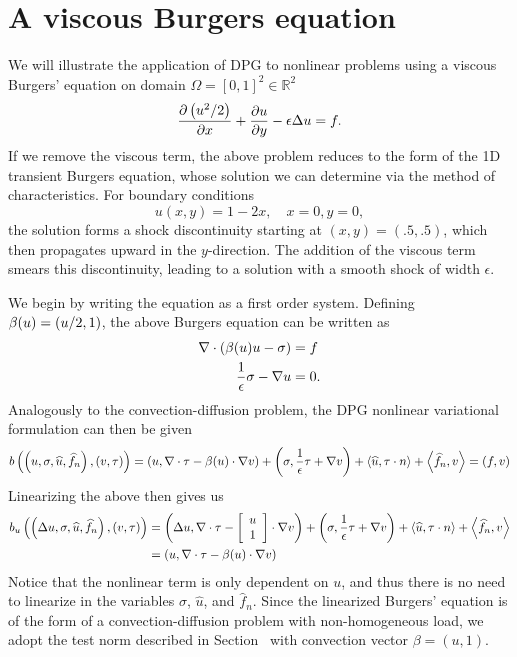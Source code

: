 \section{A viscous Burgers equation}

We will illustrate the application of DPG to nonlinear problems using a viscous Burgers' equation on domain $\Omega = [0,1]^2 \in \mathbb{R}^2$ \cite{MITDPG}
\[
\pd{\left(u^2/2\right)}{x} + \pd{u}{y} - \epsilon \Delta u = f.
\]
If we remove the viscous term, the above problem reduces to the form of the 1D transient Burgers equation, whose solution we can determine via the method of characteristics.  For boundary conditions 
\[
u(x,y) = 1-2x, \quad x = 0, y = 0,
\]
the solution forms a shock discontinuity starting at $(x,y) = (.5,.5)$, which then propagates upward in the $y$-direction.  The addition of the viscous term smears this discontinuity, leading to a solution with a smooth shock of width $\epsilon$.  

We begin by writing the equation as a first order system.  Defining $\beta(u) = \LRp{u/2,1}$, the above Burgers equation can be written as 
\begin{align*}
\div\left(\beta(u)u-\sigma\right) &=f \\
\frac{1}{\epsilon}\sigma - \grad u &=0.
\end{align*}
Analogously to the convection-diffusion problem, the DPG nonlinear variational formulation can then be given
\[
b\left(\left(u,\sigma,\widehat{u},\widehat{f}_n\right),\left(v,\tau\right)\right) = \LRp{u,\div \tau - \beta(u) \cdot \grad v} + \LRp{\sigma, \frac{1}{\epsilon}\tau + \grad v} + \LRa{\widehat{u},\tau\cdot n} + \LRa{\widehat{f}_n,v} = \LRp{f,v}
\]
Linearizing the above then gives us 
\begin{align*}
b_u\left(\left(\Delta u,\sigma,\widehat{u},\widehat{f}_n\right),\left(v,\tau\right)\right) &= \LRp{\Delta u,\div \tau - \vecttwo{u}{1} \cdot \grad v} + \LRp{\sigma, \frac{1}{\epsilon}\tau + \grad v} + \LRa{\widehat{u},\tau\cdot n} + \LRa{\widehat{f}_n,v} \\
&= \LRp{u,\div \tau - \beta(u)\cdot \grad v} 
\end{align*}
Notice that the nonlinear term is only dependent on $u$, and thus there is no need to linearize in the variables $\sigma$, $\widehat{u}$, and $\widehat{f}_n$.  Since the linearized Burgers' equation is of the form of a convection-diffusion problem with non-homogeneous load, we adopt the test norm described in Section~ with convection vector $\beta = (u,1)$.  

